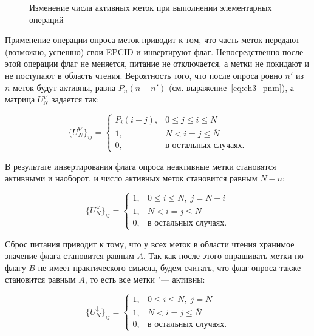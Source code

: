 \begin{figure}[htb]
  \caption{Изменение числа активных меток при выполнении элементарных операций}
  \label{fig:ch3_bg_trans}
\end{figure}

Применение операции опроса меток приводит к том, что часть меток передают (возможно, успешно) свои EPCID и инвертируют флаг. Непосредственно после этой операции флаг не меняется, питание не отключается, а метки не покидают и не поступают в область чтения. Вероятность того, что после опроса ровно $n'$ из $n$ меток будут активны, равна $P_n(n - n')$ (см. выражение~\eqref{eq:ch3_pnm}), а матрица $U_N^\nabla$ задается так:

\begin{equation}\label{eq:ch3_bg_inventory}
	\{ U_N^\nabla \}_{ij} = \begin{cases}
		P_i(i - j), & 0 \leqslant j \leqslant i \leqslant N\\
		1,          & N < i = j \leqslant \overline{N}\\
		0,          & \text{в остальных случаях.}
 	\end{cases}
\end{equation}

В результате инвертирования флага опроса неактивные метки становятся активными и наоборот, и число активных меток становится равным $N - n$:

\begin{equation}\label{eq:ch3_bg_switch}
	\{ U_N^\times \}_{ij} = \begin{cases}
 		1, & 0 \leqslant i \leqslant N,\; j = N - i\\
 		1, & N < i = j \leqslant \overline{N}\\
 		0, & \text{в остальных случаях.}
 	\end{cases}
\end{equation}

Сброс питания приводит к тому, что у всех меток в области чтения хранимое значение флага становится равным $A$. Так как после этого опрашивать метки по флагу $B$ не имеет практического смысла, будем считать, что флаг опроса также становится равным $A$, то есть все метки "--- активны:

\begin{equation}\label{eq:ch3_bg_power_off}
	\{ U_N^\downarrow \}_{ij} = \begin{cases}
 		1, & 0 \leqslant i \leqslant N,\; j = N\\
 		1, & N < i = j \leqslant \overline{N}\\
 		0, & \text{в остальных случаях.}
 	\end{cases}
\end{equation}

